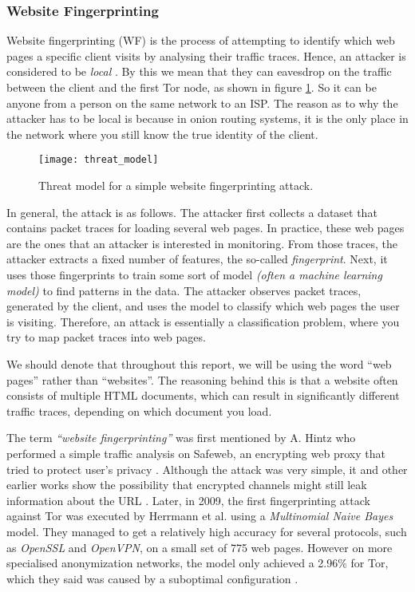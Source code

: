 \subsubsection{Website Fingerprinting} \label{sec:related-work}

Website fingerprinting (WF) is the process of attempting to identify which web pages a specific client visits by analysing their traffic traces.
Hence, an attacker is considered to be \textit{local} . By this we mean that they can eavesdrop on the traffic between the client and the first Tor node, as shown in figure \ref{fig:threat_model}.
So it can be anyone from a person on the same network to an ISP.
The reason as to why the attacker has to be local is because in onion routing systems, it is the only place in the network where you still know
the true identity of the client.

\begin{figure}[ht]
  \centering
  \texttt{[image: threat\_model]}
  \caption{Threat model for a simple website fingerprinting attack.}
  \label{fig:threat_model}
\end{figure}

In general, the attack is as follows. The attacker first collects a dataset that contains packet traces for loading several web pages.
In practice, these web pages are the ones that an attacker is interested in monitoring.
From those traces, the attacker extracts a fixed number of features, the so-called \textit{fingerprint}.
Next, it uses those fingerprints to train some sort of model \textit{(often a machine learning model)} to find patterns in the data.
The attacker observes packet traces, generated by the client, and uses the model to classify which web pages the user is visiting.
Therefore, an attack is essentially a classification problem, where you try to map packet traces into web pages.

We should denote that throughout this report, we will be using the word ``web pages'' rather than ``websites''.
The reasoning behind this is that a website often consists of multiple HTML documents,
which can result in significantly different traffic traces, depending on which document you load.

The term \textit{``website fingerprinting''} was first mentioned by A. Hintz who performed a simple traffic analysis on Safeweb,
an encrypting web proxy that tried to protect user's privacy \cite{hintz2002fingerprinting}. Although the attack was very simple, it and other earlier
works show the possibility that encrypted channels might still leak information about the URL \cite{hintz2002fingerprinting, wagner1996analysis}.
Later, in 2009, the first fingerprinting attack against Tor was executed by Herrmann et al. using a \textit{Multinomial Naive Bayes} model.
They managed to get a relatively high accuracy for several protocols, such as \textit{OpenSSL} and \textit{OpenVPN}, on a small set of 775 web pages.
However on more specialised anonymization networks, the model only achieved a 2.96\% for Tor, which they said was caused by a suboptimal configuration \cite{herrmann2009website}.

